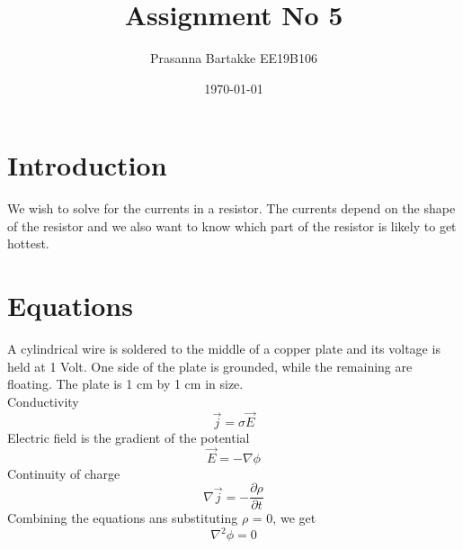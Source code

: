 \documentclass[11pt, a4paper]{article}
\title{Assignment No 5} %
\author{Prasanna Bartakke EE19B106} %
\date{\today} %
\begin{document}
		
		
\maketitle %
\section{Introduction}
We wish to solve for the currents in a resistor. The currents depend on the shape of the resistor and we also want to know which part of the resistor is likely to get hottest.

\section{Equations}
A cylindrical wire is soldered to the middle of a copper plate and its voltage is held at 1 Volt. One side of the plate is grounded, while the remaining are floating. The plate is 1 cm by 1 cm in size.\\
Conductivity
\begin{equation}
\vec{j} = \sigma\vec{E}
\end{equation}
Electric field is the gradient of the potential
\begin{equation}
\vec{E} = -\nabla\phi
\end{equation}
Continuity of charge
\begin{equation}
\nabla\vec{j} = -\frac{\partial \rho}{\partial t}
\end{equation}
Combining the equations ans substituting $\rho$ = 0, we get
\begin{equation}
\nabla^2 \phi = 0
\end{equation}
\end{document}
